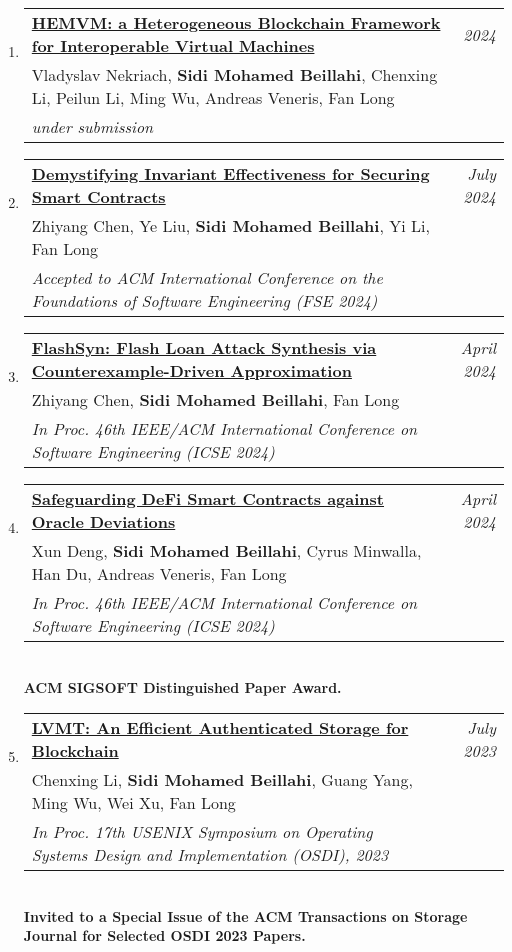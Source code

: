 \documentclass[10pt]{article}
\makeatletter
\newcommand{\lbar}[1]{{\color{#1}\ding{118}}\hspace*{2pt}}
\newenvironment{benumerate}[2]{
    \let\oldItem\item
    \def\item{\addtocounter{enumi}{-2}\oldItem}
    \begin{enumerate}[#2] \itemsep3pt
    \setcounter{enumi}{#1}
    \addtocounter{enumi}{1}}
  {\end{enumerate}}
\newenvironment{publication}[5]
{ \item
  \begin{tabular*}{7.5in}{p{6.3in}@{\extracolsep{\fill}}r}
    \href{#1}{\textbf{#2}} & \textit{#3}\\ #4 &\\ \textit{#5}&\\
  \end{tabular*}
} {}
\newenvironment{region}[3]{%
  \vspace*{0.5ex}
  {\scalebox{1.4}{\textbf{#1}}}
  \begin{benumerate}{#3}{\color{RoyalBlue}#2}}
  {\end{benumerate}\vspace{0.8ex}}
\makeatother
\begin{document}
\begin{region} {\lbar{black}Conference Publications}{{C}1}{18}

  \begin{publication} {https://beillahi.github.io}
		{HEMVM: a Heterogeneous Blockchain Framework for Interoperable Virtual Machines} 
		{2024} {Vladyslav Nekriach, \textbf{Sidi Mohamed Beillahi}, Chenxing Li, Peilun Li, Ming Wu, Andreas Veneris, Fan Long}
		{under submission}
  \end{publication}

  \begin{publication} {https://beillahi.github.io}
		{Demystifying Invariant Effectiveness for Securing Smart Contracts} 
		{July 2024} {Zhiyang Chen, Ye Liu, \textbf{Sidi Mohamed Beillahi}, Yi Li, Fan Long}
		{Accepted to ACM International Conference on the Foundations of Software Engineering (FSE 2024)}
  \end{publication}
 
  \begin{publication} {https://arxiv.org/pdf/2206.10708.pdf}
		{FlashSyn: Flash Loan Attack Synthesis via Counterexample-Driven Approximation} 
		{April 2024} {Zhiyang Chen, \textbf{Sidi Mohamed Beillahi}, Fan Long}
		{In Proc. 46th IEEE/ACM International Conference on Software Engineering (ICSE 2024)}
  \end{publication}

  \begin{publication} {https://arxiv.org/pdf/2401.06044.pdf}
		{Safeguarding DeFi Smart Contracts against Oracle Deviations} 
		{April 2024} {Xun Deng, \textbf{Sidi Mohamed Beillahi}, Cyrus Minwalla, Han Du, Andreas Veneris, Fan Long}
		{In Proc. 46th IEEE/ACM International Conference on Software Engineering (ICSE 2024)}
    {\\ \textbf{ACM SIGSOFT Distinguished Paper Award.}}
  \end{publication}



  \begin{publication} {https://beillahi.github.io/papers/OSDI23.pdf}
		{LVMT: An Efficient Authenticated Storage for Blockchain} 
		{July 2023} {Chenxing Li, \textbf{Sidi Mohamed Beillahi}, Guang Yang, Ming Wu, Wei Xu, Fan Long}
		{In Proc. 17th USENIX Symposium on Operating Systems Design and Implementation (OSDI), 2023}
    {\\ \textbf{Invited to a Special Issue of the ACM Transactions on Storage Journal for Selected OSDI 2023 Papers.}}
  \end{publication}


\end{region}
\end{document}
